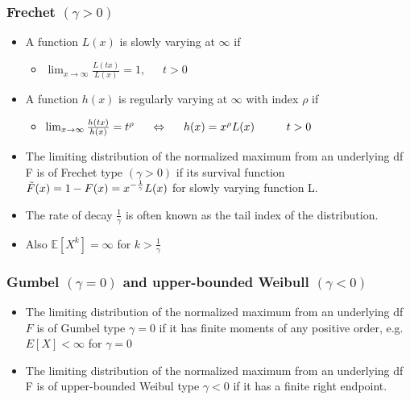 \documentclass{article}
\begin{document}
\subsubsection{Frechet $(\gamma>0)$}

\begin{itemize}
    \item A function $L(x)$ is slowly varying at $\infty$ if
    \begin{itemize}
        \item $\lim_{x\rightarrow \infty}\frac{L(tx)}{L(x)} = 1, \, \, \, \, \, \, \, \, \, t>0$
    \end{itemize}
    \item A function $h(x)$ is regularly varying at $\infty$ with index $\rho$ if
    \begin{itemize}
        \item $\lim_{x \rightarrow \infty} \frac{h(tx)}{h(x)} = t^\rho \hspace{0.5cm} \Leftrightarrow \hspace{0.5cm} h(x) = x^\rho L(x) \hspace{1cm} t > 0$
    \end{itemize}
    \item The limiting distribution of the normalized maximum from an underlying df F is of Frechet type $(\gamma > 0)$ if its survival function $\Tilde{F}(x) = 1 - F(x) = x^{-\frac{1}{\gamma}} L(x)$ for slowly varying function L.
    \item The rate of decay $\frac{1}{\gamma}$ is often known as the tail index of the distribution.
    \item Also $\mathbb{E}[X^k] = \infty$ for $k > \frac{1}{\gamma}$
\end{itemize}




\subsubsection{Gumbel $(\gamma = 0)$ and upper-bounded Weibull $(\gamma<0)$}
\begin{itemize}
    \item The limiting distribution of the normalized maximum from an underlying df $F$ is of Gumbel type $\gamma = 0$ if it has finite moments of any positive order, e.g. $E[X] < \infty$ for $\gamma = 0$
    \item The limiting distribution of the normalized maximum from an underlying df F is of upper-bounded Weibul type $\gamma < 0$ if it has a finite right endpoint.
\end{itemize}
\end{document}

